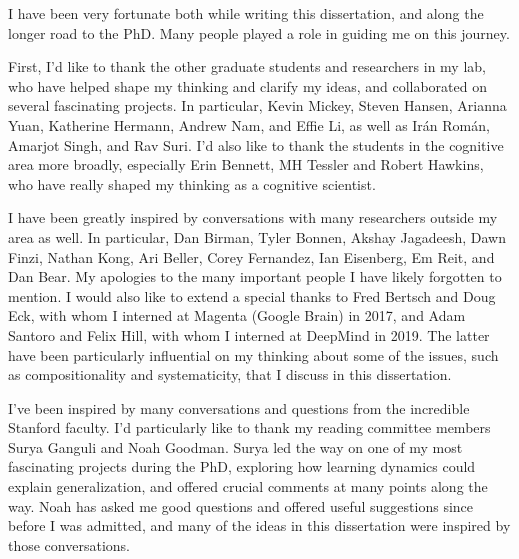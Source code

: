 \documentclass{report}
\begin{document}

I have been very fortunate both while writing this dissertation, and along the longer road to the PhD. Many people played a role in guiding me on this journey.

First, I'd like to thank the other graduate students and researchers in my lab, who have helped shape my thinking and clarify my ideas, and collaborated on several fascinating projects. In particular, Kevin Mickey, Steven Hansen, Arianna Yuan, Katherine Hermann, Andrew Nam, and Effie Li, as well as Ir\'an Rom\'an, Amarjot Singh, and Rav Suri. I'd also like to thank the students in the cognitive area more broadly, especially Erin Bennett, MH Tessler and Robert Hawkins, who have really shaped my thinking as a cognitive scientist. 

I have been greatly inspired by conversations with many researchers outside my area as well. In particular, Dan Birman, Tyler Bonnen, Akshay Jagadeesh, Dawn Finzi, Nathan Kong, Ari Beller, Corey Fernandez, Ian Eisenberg, Em Reit, and Dan Bear. My apologies to the many important people I have likely forgotten to mention. I would also like to extend a special thanks to Fred Bertsch and Doug Eck, with whom I interned at Magenta (Google Brain) in 2017, and Adam Santoro and Felix Hill, with whom I interned at DeepMind in 2019. The latter have been particularly influential on my thinking about some of the issues, such as compositionality and systematicity, that I discuss in this dissertation. 


I've been inspired by many conversations and questions from the incredible Stanford faculty. I'd particularly like to thank my reading committee members Surya Ganguli and Noah Goodman. Surya led the way on one of my most fascinating projects during the PhD, exploring how learning dynamics could explain generalization, and offered crucial comments at many points along the way. Noah has asked me good questions and offered useful suggestions since before I was admitted, and many of the ideas in this dissertation were inspired by those conversations. 
\end{document}
